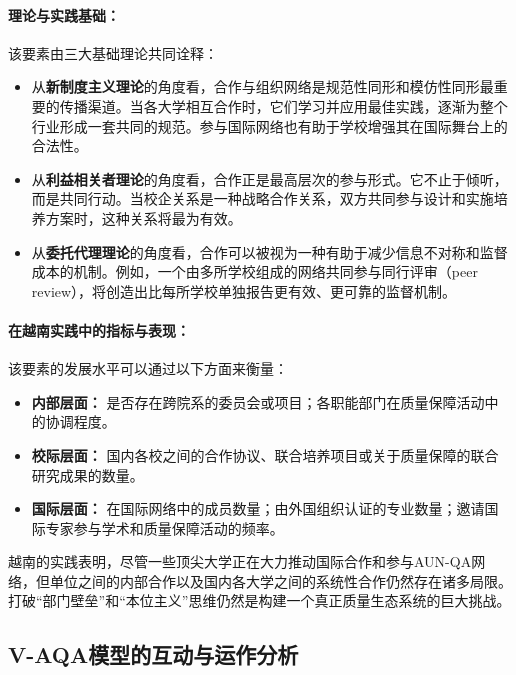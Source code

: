 \paragraph{理论与实践基础：}
该要素由三大基础理论共同诠释：
\begin{itemize}
    \item 从\textbf{新制度主义理论}的角度看，合作与组织网络是规范性同形和模仿性同形最重要的传播渠道。当各大学相互合作时，它们学习并应用最佳实践，逐渐为整个行业形成一套共同的规范。参与国际网络也有助于学校增强其在国际舞台上的合法性。
    \item 从\textbf{利益相关者理论}的角度看，合作正是最高层次的参与形式。它不止于倾听，而是共同行动。当校企关系是一种战略合作关系，双方共同参与设计和实施培养方案时，这种关系将最为有效。
    \item 从\textbf{委托代理理论}的角度看，合作可以被视为一种有助于减少信息不对称和监督成本的机制。例如，一个由多所学校组成的网络共同参与同行评审（peer review），将创造出比每所学校单独报告更有效、更可靠的监督机制。
\end{itemize}

\paragraph{在越南实践中的指标与表现：}
该要素的发展水平可以通过以下方面来衡量：
\begin{itemize}
    \item \textbf{内部层面：} 是否存在跨院系的委员会或项目；各职能部门在质量保障活动中的协调程度。
    \item \textbf{校际层面：} 国内各校之间的合作协议、联合培养项目或关于质量保障的联合研究成果的数量。
    \item \textbf{国际层面：} 在国际网络中的成员数量；由外国组织认证的专业数量；邀请国际专家参与学术和质量保障活动的频率。
\end{itemize}
越南的实践表明，尽管一些顶尖大学正在大力推动国际合作和参与AUN-QA网络，但单位之间的内部合作以及国内各大学之间的系统性合作仍然存在诸多局限。打破“部门壁垒”和“本位主义”思维仍然是构建一个真正质量生态系统的巨大挑战。

\subsection{V-AQA模型的互动与运作分析}
\label{subsec:tuong_tac_V-AQA}


